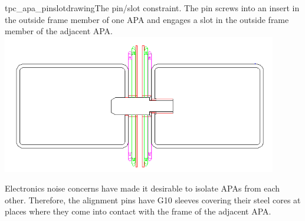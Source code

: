 \begin{cdrfigure}{tpc_apa_pinslotdrawing}{The pin/slot constraint.  The pin screws into an insert in the outside frame member of one APA and engages a slot in the outside frame member of the adjacent APA.}
\includegraphics[width=0.9\textwidth]{figures/tpc_apa_pinslotdrawing.png} 
\end{cdrfigure}

Electronics noise concerns have made it desirable to isolate APAs from each other.  Therefore, the alignment pins have G10 sleeves covering their steel cores at places where they come into contact with the frame of the adjacent APA.


